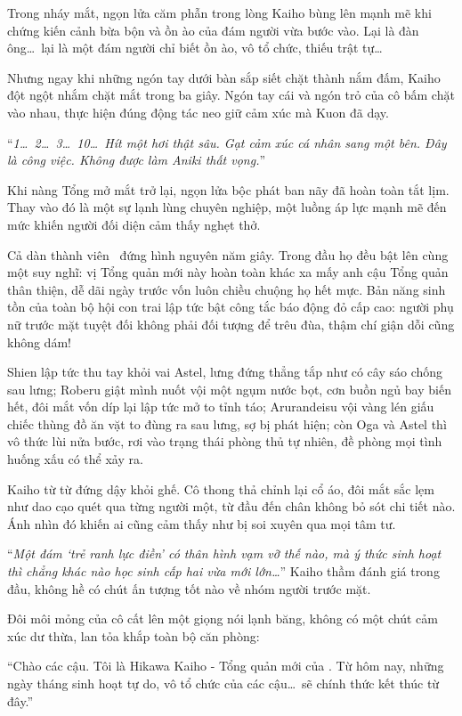 \documentclass[../main.tex]{subfiles}
\begin{document}
Trong nháy mắt, ngọn lửa căm phẫn trong lòng Kaiho bùng lên mạnh mẽ khi chứng kiến cảnh bừa bộn và ồn ào của đám người vừa bước vào. Lại là đàn ông\dots\ lại là một đám người chỉ biết ồn ào, vô tổ chức, thiếu trật tự\dots\

Nhưng ngay khi những ngón tay dưới bàn sắp siết chặt thành nắm đấm, Kaiho đột ngột nhắm chặt mắt trong ba giây. Ngón tay cái và ngón trỏ của cô bấm chặt vào nhau, thực hiện đúng động tác neo giữ cảm xúc mà Kuon đã dạy.

``\textit{1\dots\ 2\dots\ 3\dots\ 10\dots\ Hít một hơi thật sâu. Gạt cảm xúc cá nhân sang một bên. Đây là công việc. Không được làm Aniki thất vọng.}''

Khi nàng Tổng mở mắt trở lại, ngọn lửa bộc phát ban nãy đã hoàn toàn tắt lịm. Thay vào đó là một sự lạnh lùng chuyên nghiệp, một luồng áp lực mạnh mẽ đến mức khiến người đối diện cảm thấy nghẹt thở.

Cả dàn thành viên \hls\ đứng hình nguyên năm giây. Trong đầu họ đều bật lên cùng một suy nghĩ: vị Tổng quản mới này hoàn toàn khác xa mấy anh cậu Tổng quản thân thiện, dễ dãi ngày trước vốn luôn chiều chuộng họ hết mực. Bản năng sinh tồn của toàn bộ hội con trai lập tức bật công tắc báo động đỏ cấp cao: người phụ nữ trước mặt tuyệt đối không phải đối tượng để trêu đùa, thậm chí giận dỗi cũng không dám!

Shien lập tức thu tay khỏi vai Astel, lưng đứng thẳng tắp như có cây sáo chống sau lưng; Roberu giật mình nuốt vội một ngụm nước bọt, cơn buồn ngủ bay biến hết, đôi mắt vốn díp lại lập tức mở to tỉnh táo; Arurandeisu vội vàng lén giấu chiếc thùng đồ ăn vặt to đùng ra sau lưng, sợ bị phát hiện; còn Oga và Astel thì vô thức lùi nửa bước, rơi vào trạng thái phòng thủ tự nhiên, đề phòng mọi tình huống xấu có thể xảy ra.

Kaiho từ từ đứng dậy khỏi ghế. Cô thong thả chỉnh lại cổ áo, đôi mắt sắc lẹm như dao cạo quét qua từng người một, từ đầu đến chân không bỏ sót chi tiết nào. Ánh nhìn đó khiến ai cũng cảm thấy như bị soi xuyên qua mọi tâm tư.

``\textit{Một đám `trẻ ranh lực điền' có thân hình vạm vỡ thế nào, mà ý thức sinh hoạt thì chẳng khác nào học sinh cấp hai vừa mới lớn\dots}'' Kaiho thầm đánh giá trong đầu, không hề có chút ấn tượng tốt nào về nhóm người trước mặt.

Đôi môi mỏng của cô cất lên một giọng nói lạnh băng, không có một chút cảm xúc dư thừa, lan tỏa khắp toàn bộ căn phòng:

``Chào các cậu. Tôi là Hikawa Kaiho - Tổng quản mới của \hls. Từ hôm nay, những ngày tháng sinh hoạt tự do, vô tổ chức của các cậu\dots\ sẽ chính thức kết thúc từ đây.''
\end{document}
